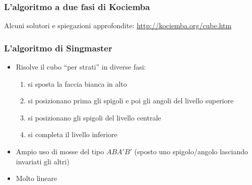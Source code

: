 \documentclass{beamer}
\begin{document}
\begin{frame}
\frametitle{L'algoritmo a due fasi di Kociemba}
Alcuni solutori e spiegazioni approfondite: \url{http://kociemba.org/cube.htm}
\end{frame}

\begin{frame}
\frametitle{L'algoritmo di Singmaster}
\begin{itemize}
\item Risolve il cubo ``per strati'' in diverse fasi:
\begin{enumerate}
\item si sposta la faccia bianca in alto
\item si posizionano prima gli spigoli e poi gli angoli del livello superiore
\item si posizionano gli spigoli del livello centrale
\item si completa il livello inferiore
\end{enumerate}
\item Ampio uso di mosse del tipo $A B A' B'$ (sposto uno spigolo/angolo
lasciando invariati gli altri)
\item Molto lineare
\end{itemize}
\end{frame}
\end{document}
